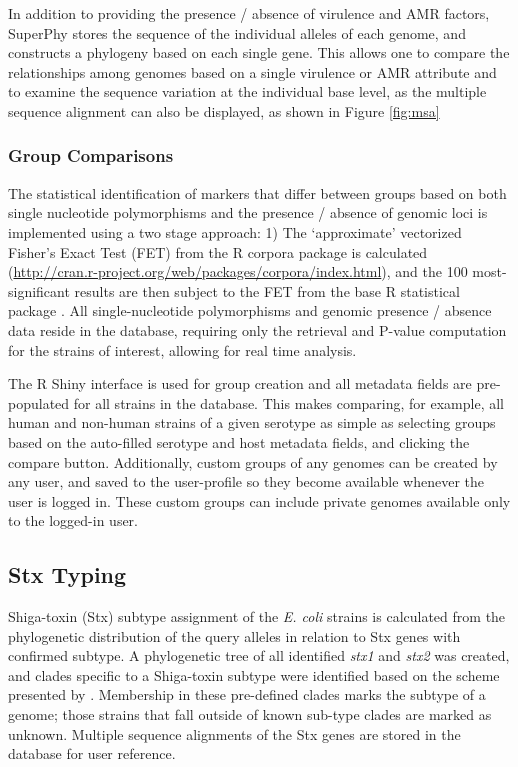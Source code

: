 \documentclass[doublespacing, linenumbers]{bmcart}
\begin{document}
In addition to providing the presence / absence of virulence and AMR factors, SuperPhy stores the sequence of the individual alleles of each genome, and constructs a phylogeny based on each single gene. This allows one to compare the relationships among genomes based on a single virulence or AMR attribute and to examine the sequence variation at the individual base level, as the multiple sequence alignment can also be displayed, as shown in Figure \ref{fig:msa}

\subsubsection{Group Comparisons}
The statistical identification of markers that differ between groups based on both single nucleotide polymorphisms and the presence / absence of genomic loci is implemented using a two stage approach: 1) The `approximate' vectorized Fisher’s Exact Test (FET) from the R corpora package is calculated (\url{http://cran.r-project.org/web/packages/corpora/index.html}), and the 100 most-significant results are then subject to the FET from the base R statistical package \cite{r_foundation_for_statistical_computing_r:_2005}. All single-nucleotide polymorphisms and genomic presence / absence data reside in the database, requiring only the retrieval and P-value computation for the strains of interest, allowing for real time analysis.

The R Shiny interface is used for group creation and all metadata fields are pre-populated for all strains in the database. This makes comparing, for example, all human and non-human strains of a given serotype as simple as selecting groups based on the auto-filled serotype and host metadata fields, and clicking the compare button. Additionally, custom groups of any genomes can be created by any user, and saved to the user-profile so they become available whenever the user is logged in. These custom groups can include private genomes available only to the logged-in user.

\subsection{Stx Typing}
Shiga-toxin (Stx) subtype assignment of the \textit{E. coli} strains is calculated from the phylogenetic distribution of the query alleles in relation to Stx genes with confirmed subtype. A phylogenetic tree of all identified \textit{stx1} and \textit{stx2} was created, and clades specific to a Shiga-toxin subtype were identified based on the scheme presented by \cite{scheutz_multicenter_2012}. Membership in these pre-defined clades marks the subtype of a genome; those strains that fall outside of known sub-type clades are marked as unknown. Multiple sequence alignments of the Stx genes are stored in the database for user reference.
\end{document}
